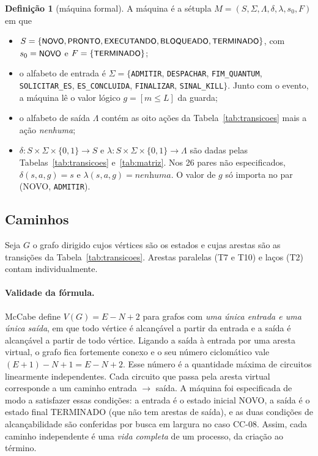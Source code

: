 \documentclass[11pt,a4paper]{article}
\theoremstyle{definition}
\newtheorem{definicao}{Definição}
\newcommand{\est}[1]{\textsf{\small #1}}   %
\newcommand{\ev}[1]{\texttt{\small #1}}    %
\newcommand{\VG}{V(G)}
\begin{document}
\begin{definicao}[máquina formal]\label{def:maquina}
A máquina é a sétupla $M = (S, \Sigma, \Lambda, \delta, \lambda, s_0, F)$ em que
\begin{itemize}
  \item $S = \{\est{NOVO}, \est{PRONTO}, \est{EXECUTANDO}, \est{BLOQUEADO}, \est{TERMINADO}\}$, com
        $s_0 = \est{NOVO}$ e $F = \{\est{TERMINADO}\}$;
  \item o alfabeto de entrada é $\Sigma = \{$\ev{ADMITIR}, \ev{DESPACHAR}, \ev{FIM\_QUANTUM},
        \ev{SOLICITAR\_ES}, \ev{ES\_CONCLUIDA}, \ev{FINALIZAR}, \ev{SINAL\_KILL}$\}$. Junto com o
        evento, a máquina lê o valor lógico $g = [m \le L]$ da guarda;
  \item o alfabeto de saída $\Lambda$ contém as oito ações da Tabela~\ref{tab:transicoes} mais a ação
        \emph{nenhuma};
  \item $\delta : S \times \Sigma \times \{0,1\} \to S$ e $\lambda : S \times \Sigma \times \{0,1\}
        \to \Lambda$ são dadas pelas Tabelas~\ref{tab:transicoes} e~\ref{tab:matriz}. Nos 26 pares
        não especificados, $\delta(s, a, g) = s$ e $\lambda(s, a, g) = \textit{nenhuma}$. O valor de
        $g$ só importa no par (\est{NOVO}, \ev{ADMITIR}).
\end{itemize}
\end{definicao}

\subsection{Caminhos}\label{sec:caminhos}

Seja $G$ o grafo dirigido cujos vértices são os estados e cujas arestas são as transições da
Tabela~\ref{tab:transicoes}. Arestas paralelas (T7 e T10) e laços (T2) contam individualmente.

\paragraph{Validade da fórmula.} McCabe \cite{mccabe} define $\VG = E - N + 2$ para grafos com
\emph{uma única entrada e uma única saída}, em que todo vértice é alcançável a partir da entrada e a
saída é alcançável a partir de todo vértice. Ligando a saída à entrada por uma aresta virtual, o
grafo fica fortemente conexo e o seu número ciclomático vale $(E+1) - N + 1 = E - N + 2$. Esse
número é a quantidade máxima de circuitos linearmente independentes. Cada circuito que passa pela
aresta virtual corresponde a um caminho entrada $\to$ saída. A máquina foi especificada de modo
a satisfazer essas condições: a entrada é o estado inicial \est{NOVO}, a saída é o estado final
\est{TERMINADO} (que não tem arestas de saída), e as duas condições de alcançabilidade são
conferidas por busca em largura no caso CC-08. Assim, cada caminho independente é uma \emph{vida
completa} de um processo, da criação ao término.
\end{document}
